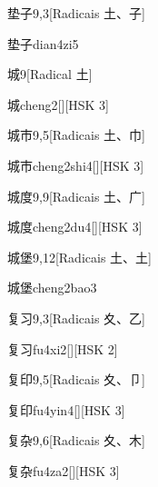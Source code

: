 \begin{entry}{垫子}{9,3}[Radicais ⼟、⼦]
  \begin{phonetics}{垫子}{dian4zi5}
  \end{phonetics}
\end{entry}

\begin{entry}{城}{9}[Radical ⼟]
  \begin{phonetics}{城}{cheng2}[][HSK 3]
  \end{phonetics}
\end{entry}

\begin{entry}{城市}{9,5}[Radicais ⼟、⼱]
  \begin{phonetics}{城市}{cheng2shi4}[][HSK 3]
  \end{phonetics}
\end{entry}

\begin{entry}{城度}{9,9}[Radicais ⼟、⼴]
  \begin{phonetics}{城度}{cheng2du4}[][HSK 3]
  \end{phonetics}
\end{entry}

\begin{entry}{城堡}{9,12}[Radicais ⼟、⼟]
  \begin{phonetics}{城堡}{cheng2bao3}
  \end{phonetics}
\end{entry}

\begin{entry}{复习}{9,3}[Radicais ⼢、⼄]
  \begin{phonetics}{复习}{fu4xi2}[][HSK 2]
  \end{phonetics}
\end{entry}

\begin{entry}{复印}{9,5}[Radicais ⼢、⼙]
  \begin{phonetics}{复印}{fu4yin4}[][HSK 3]
  \end{phonetics}
\end{entry}

\begin{entry}{复杂}{9,6}[Radicais ⼢、⽊]
  \begin{phonetics}{复杂}{fu4za2}[][HSK 3]
  \end{phonetics}
\end{entry}

